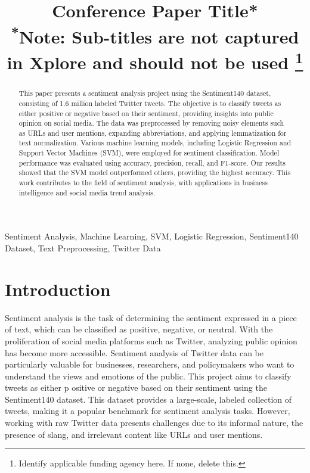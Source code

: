 \documentclass[conference]{IEEEtran}
\begin{document}
\title{Conference Paper Title*\\
{\footnotesize \textsuperscript{*}Note: Sub-titles are not captured in Xplore and
should not be used}
\thanks{Identify applicable funding agency here. If none, delete this.}
}

\author{
}

\maketitle

\begin{abstract}
This paper presents a sentiment analysis project using the Sentiment140 dataset, consisting of 1.6 million labeled Twitter tweets. The objective is to classify tweets as either positive or negative based on their sentiment, providing insights into public opinion on social media. The data was preprocessed by removing noisy elements such as URLs and user mentions, expanding abbreviations, and applying lemmatization for text normalization. Various machine learning models, including Logistic Regression and Support Vector Machines (SVM), were employed for sentiment classification. Model performance was evaluated using accuracy, precision, recall, and F1-score. Our results showed that the SVM model outperformed others, providing the highest accuracy. This work contributes to the field of sentiment analysis, with applications in business intelligence and social media trend analysis.
\end{abstract}

\begin{IEEEkeywords}
Sentiment Analysis, Machine Learning, SVM, Logistic Regression, Sentiment140 Dataset, Text Preprocessing, Twitter Data
\end{IEEEkeywords}

\section{Introduction}
Sentiment analysis is the task of determining the sentiment expressed in a piece of text, 
which can be classified as positive, negative, or neutral. With the proliferation of social media platforms such as Twitter, 
analyzing public opinion has become more accessible. Sentiment analysis of Twitter data can be particularly valuable for businesses, 
researchers, and policymakers who want to understand the views and emotions of the public. This project aims to classify tweets as either p
ositive or negative based on their sentiment using the Sentiment140 dataset. This dataset provides a large-scale, labeled collection of tweets, 
making it a popular benchmark for sentiment analysis tasks. However, working with raw Twitter data presents challenges due to its informal nature, the presence of slang, and irrelevant content like URLs and user mentions.
\end{document}
